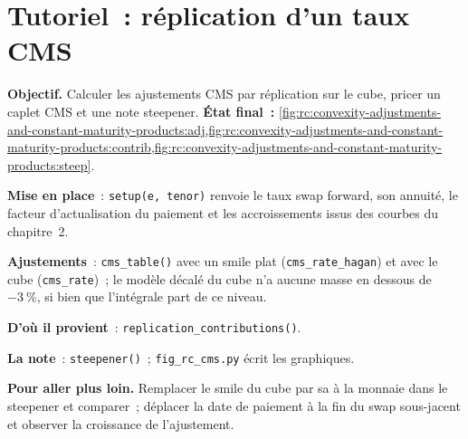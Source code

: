 \begin{omfigure}

\label{fig:rc:convexity-adjustments-and-constant-maturity-products:steep}
\end{omfigure}

\section{Tutoriel~: réplication d'un taux CMS}\label{tut:rc:convexity-adjustments-and-constant-maturity-products:tutorial}

\begin{tutorial}
\textbf{Objectif.} Calculer les ajustements CMS par réplication sur le cube, pricer un caplet CMS
et une note steepener. \textbf{État final~:}
\cref{fig:rc:convexity-adjustments-and-constant-maturity-products:adj,fig:rc:convexity-adjustments-and-constant-maturity-products:contrib,fig:rc:convexity-adjustments-and-constant-maturity-products:steep}.
\begin{tutsteps}
\item \textbf{Mise en place}~: \texttt{setup(e, tenor)} renvoie le taux swap forward, son
annuité, le facteur d'actualisation du paiement et les accroissements issus des courbes du chapitre~2.
\item \textbf{Ajustements}~: \texttt{cms\_table()} avec un smile plat
(\texttt{cms\_rate\_hagan}) et avec le cube (\texttt{cms\_rate})~; le modèle décalé du cube
n'a aucune masse en dessous de $-3~\%$, si bien que l'intégrale part de ce niveau.
\item \textbf{D'où il provient}~: \texttt{replication\_contributions()}.
\item \textbf{La note}~: \texttt{steepener()}~; \texttt{fig\_rc\_cms.py} écrit les
graphiques.
\end{tutsteps}
\textbf{Pour aller plus loin.} Remplacer le smile du cube par sa  à la monnaie
dans le steepener et comparer~; déplacer la date de paiement à la fin du
swap sous-jacent et observer la croissance de l'ajustement.
\end{tutorial}

